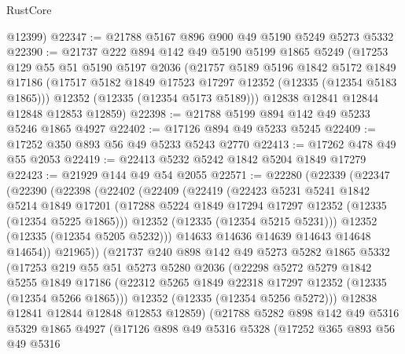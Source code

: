 \begin{lexlean}{RustCore}
\begin{coremodule}
      @12399)
@22347 := @21788 @5167 @896 @900 @49 @5190 @5249 @5273 @5332
@22390 := @21737
    @222
    @894
    @142
    @49
    @5190
    @5199
    @1865
    @5249
    (@17253
      @129
      @55
      @51
      @5190
      @5197
      @2036
      (@21757
        @5189
        @5196
        @1842
        @5172
        @1849
        @17186
        (@17517 @5182 @1849 @17523 @17297 @12352 (@12335 (@12354 @5183 @1865)))
        @12352
        (@12335 (@12354 @5173 @5189)))
      @12838
      @12841
      @12844
      @12848
      @12853
      @12859)
@22398 := @21788 @5199 @894 @142 @49 @5233 @5246 @1865 @4927
@22402 := @17126 @894 @49 @5233 @5245
@22409 := @17252 @350 @893 @56 @49 @5233 @5243 @2770
@22413 := @17262 @478 @49 @55 @2053
@22419 := @22413 @5232 @5242 @1842 @5204 @1849 @17279
@22423 := @21929 @144 @49 @54 @2055
@22571 := @22280
    (@22339
      (@22347
        (@22390
          (@22398
            (@22402
              (@22409
                (@22419
                  (@22423
                    @5231
                    @5241
                    @1842
                    @5214
                    @1849
                    @17201
                    (@17288 @5224 @1849 @17294 @17297 @12352 (@12335 (@12354 @5225 @1865)))
                    @12352
                    (@12335 (@12354 @5215 @5231)))
                  @12352
                  (@12335 (@12354 @5205 @5232)))
                @14633
                @14636
                @14639
                @14643
                @14648
                @14654))
            @21965))
        (@21737
          @240
          @898
          @142
          @49
          @5273
          @5282
          @1865
          @5332
          (@17253
            @219
            @55
            @51
            @5273
            @5280
            @2036
            (@22298
              @5272
              @5279
              @1842
              @5255
              @1849
              @17186
              (@22312 @5265 @1849 @22318 @17297 @12352 (@12335 (@12354 @5266 @1865)))
              @12352
              (@12335 (@12354 @5256 @5272)))
            @12838
            @12841
            @12844
            @12848
            @12853
            @12859)
          (@21788
            @5282
            @898
            @142
            @49
            @5316
            @5329
            @1865
            @4927
            (@17126
              @898
              @49
              @5316
              @5328
              (@17252
                @365
                @893
                @56
                @49
                @5316

\end{coremodule}
\end{lexlean}
